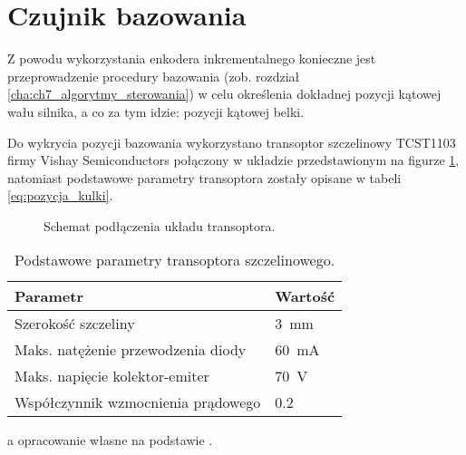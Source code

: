 \section{Czujnik bazowania}
\label{sec:ch3_czujnik_bazowania}

Z powodu wykorzystania enkodera inkrementalnego konieczne jest przeprowadzenie procedury bazowania (zob. rozdział \ref{cha:ch7_algorytmy_sterowania}) w celu określenia dokładnej pozycji kątowej wału silnika, a co za tym idzie: pozycji kątowej belki.

Do wykrycia pozycji bazowania wykorzystano transoptor szczelinowy TCST1103 firmy Vishay Semiconductors połączony w układzie przedstawionym na figurze \ref{fig:uklad_transoptora}, natomiast podstawowe parametry transoptora zostały opisane w tabeli \ref{eq:pozycja_kulki}.

\begin{figure}[H]
    \centering
    
    \caption{Schemat podłączenia układu transoptora.}
    \label{fig:uklad_transoptora}
\end{figure}

\begin{table}[h]
    \centering
    \begin{threeparttable}
        \caption{Podstawowe parametry transoptora szczelinowego.}
        \label{tab:parametry_transoptora}
        
        \begin{tabularx}{0.6\textwidth}{l | l}
            \toprule
            Parametr & Wartość \\
            \midrule
            Szerokość szczeliny & \SI{3}{\milli\meter} \\
            Maks. natężenie przewodzenia diody & \SI{60}{\milli\ampere} \\
            Maks. napięcie kolektor-emiter & \SI{70}{\volt} \\
            Współczynnik wzmocnienia prądowego & \num{0,2} \\
            \bottomrule
        \end{tabularx}
        
        \begin{tablenotes}
            \footnotesize
            \item[a] opracowanie własne na podstawie \cite{TRANSOPTOR_MANUAL}.
        \end{tablenotes}
    \end{threeparttable}
\end{table}

